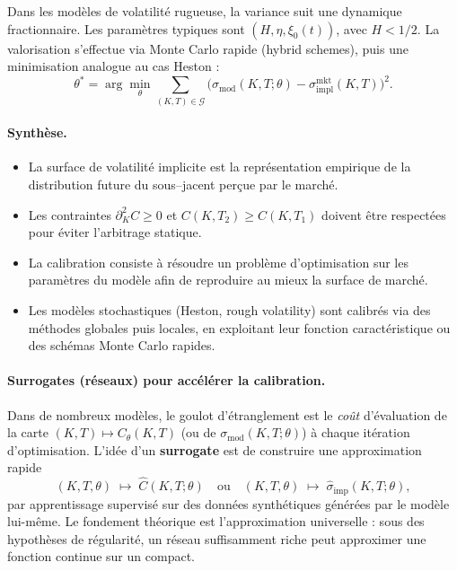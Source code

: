 \documentclass[11pt,a4paper]{article}
\newcommand{\1}{\mathbf{1}}
\begin{document}
Dans les mod\`eles de volatilité rugueuse, la variance suit une dynamique
fractionnaire. Les paramètres typiques sont $(H,\eta,\xi_0(t))$, avec $H<1/2$.
La valorisation s'effectue via Monte Carlo rapide (hybrid schemes), puis une
minimisation analogue au cas Heston :
\[
\theta^*
=
\arg\min_{\theta}
\sum_{(K,T)\in \mathcal{G}}
\bigl(
\sigma_{\mathrm{mod}}(K,T;\theta)
-
\sigma_{\mathrm{impl}}^{\mathrm{mkt}}(K,T)
\bigr)^2.
\]

\paragraph{Synth\`ese.}

\begin{itemize}
  \item La surface de volatilité implicite est la représentation empirique de la
  distribution future du sous--jacent perçue par le marché.
  \item Les contraintes $\partial_{K}^2 C \ge 0$ et $C(K,T_2)\ge C(K,T_1)$ doivent
  être respectées pour éviter l'arbitrage statique.
  \item La calibration consiste à résoudre un problème d'optimisation sur les paramètres
  du modèle afin de reproduire au mieux la surface de marché.
  \item Les modèles stochastiques (Heston, rough volatility) sont calibrés via des
  méthodes globales puis locales, en exploitant leur fonction caractéristique ou
  des schémas Monte Carlo rapides.
\end{itemize}

\paragraph{Surrogates (r\'eseaux) pour acc\'el\'erer la calibration.}
Dans de nombreux mod\`eles, le goulot d'\'etranglement est le \emph{co\^ut} d'\'evaluation de la carte
$(K,T)\mapsto C_{\theta}(K,T)$ (ou de $\sigma_{\mathrm{mod}}(K,T;\theta)$) \`a chaque it\'eration d'optimisation.
L'id\'ee d'un \textbf{surrogate} est de construire une approximation rapide
\[
(K,T,\theta)\;\longmapsto\; \widehat C(K,T;\theta)
\quad \text{ou} \quad
(K,T,\theta)\;\longmapsto\;\widehat\sigma_{\mathrm{imp}}(K,T;\theta),
\]
par apprentissage supervis\'e sur des donn\'ees synth\'etiques g\'en\'er\'ees par le mod\`ele lui-m\^eme.
Le fondement th\'eorique est l'approximation universelle : sous des hypoth\`eses de r\'egularit\'e,
un r\'eseau suffisamment riche peut approximer une fonction continue sur un compact.
\end{document}
